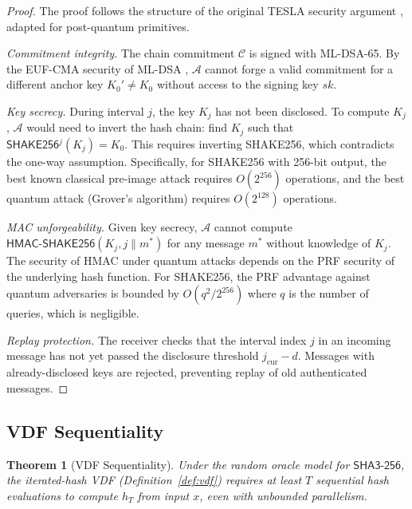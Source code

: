 \documentclass[conference,10pt]{IEEEtran}
\newtheorem{theorem}{Theorem}
\newcommand{\SHAKE}{\textsf{SHAKE256}}
\newcommand{\SHAthree}{\textsf{SHA3-256}}
\newcommand{\HMAC}{\textsf{HMAC}}
\begin{document}
\begin{proof}
The proof follows the structure of the original TESLA security argument \cite{perrig2002tesla}, adapted for post-quantum primitives.

\emph{Commitment integrity.} The chain commitment $\mathcal{C}$ is signed with ML-DSA-65. By the EUF-CMA security of ML-DSA \cite{nistfips204}, $\mathcal{A}$ cannot forge a valid commitment for a different anchor key $K_0' \neq K_0$ without access to the signing key $sk$.

\emph{Key secrecy.} During interval $j$, the key $K_j$ has not been disclosed. To compute $K_j$, $\mathcal{A}$ would need to invert the hash chain: find $K_j$ such that $\SHAKE{}^{j}(K_j) = K_0$. This requires inverting SHAKE256, which contradicts the one-way assumption. Specifically, for SHAKE256 with 256-bit output, the best known classical pre-image attack requires $O(2^{256})$ operations, and the best quantum attack (Grover's algorithm) requires $O(2^{128})$ operations.

\emph{MAC unforgeability.} Given key secrecy, $\mathcal{A}$ cannot compute $\HMAC\text{-}\SHAKE{}(K_j, j \| m^*)$ for any message $m^*$ without knowledge of $K_j$. The security of HMAC under quantum attacks depends on the PRF security of the underlying hash function. For SHAKE256, the PRF advantage against quantum adversaries is bounded by $O(q^2/2^{256})$ where $q$ is the number of queries, which is negligible.

\emph{Replay protection.} The receiver checks that the interval index $j$ in an incoming message has not yet passed the disclosure threshold $j_{\text{cur}} - d$. Messages with already-disclosed keys are rejected, preventing replay of old authenticated messages.
\end{proof}

\subsection{VDF Sequentiality}

\begin{theorem}[VDF Sequentiality]
\label{thm:vdf_seq}
Under the random oracle model for $\SHAthree{}$, the iterated-hash VDF (Definition~\ref{def:vdf}) requires at least $T$ sequential hash evaluations to compute $h_T$ from input $x$, even with unbounded parallelism.
\end{theorem}
\end{document}
